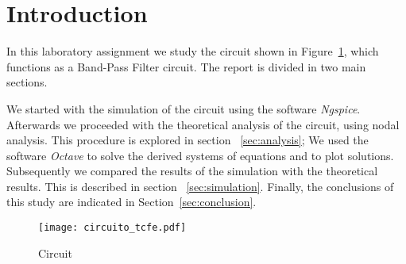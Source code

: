 \section{Introduction}
\label{sec:introduction}

\par In this laboratory assignment we study the circuit
shown in Figure~\ref{fig:circuit}, which functions as a Band-Pass Filter
circuit. The report is divided in two main sections.

We started with the simulation of the circuit using the software
\textit{Ngspice}.
Afterwards we proceeded with the theoretical analysis of the circuit,
using nodal analysis.
This procedure is explored in section ~\ref{sec:analysis};
We used the software \textit{Octave} to solve the derived systems
of equations and to plot solutions.
Subsequently we compared the results of the simulation with the
theoretical results. This is described in section ~\ref{sec:simulation}.
Finally, the conclusions of this study are indicated in
Section~\ref{sec:conclusion}.

\begin{figure}[ht] \centering
    \texttt{[image: circuito\_tcfe.pdf]}
    \caption{Circuit}
    \label{fig:circuit}
\end{figure}

